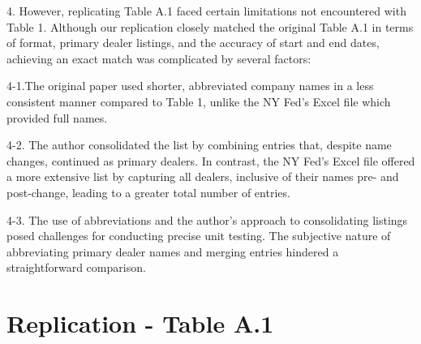 \documentclass{article}
\begin{document}
4. However, replicating Table A.1 faced certain limitations not encountered with Table 1. Although our 
replication closely matched the original Table A.1 in terms of format, primary dealer listings, and the 
accuracy of start and end dates, achieving an exact match was complicated by several factors:

4-1.The original paper used shorter, abbreviated company names in a less consistent manner compared to Table 1, 
unlike the NY Fed's Excel file which provided full names.

4-2. The author consolidated the list by combining entries that, despite name changes, continued as primary 
dealers. In contrast, the NY Fed's Excel file offered a more extensive list by capturing all dealers, 
inclusive of their names pre- and post-change, leading to a greater total number of entries.

4-3. The use of abbreviations and the author's approach to consolidating listings posed challenges for conducting 
precise unit testing. The subjective nature of abbreviating primary dealer names and merging entries hindered a 
straightforward comparison.





\par

\small {\section{Replication - Table A.1}}

\begin{table}[ht]
\begin{adjustbox}{width=\textwidth}

\end{adjustbox}
\end{table}
\par
\end{document}
